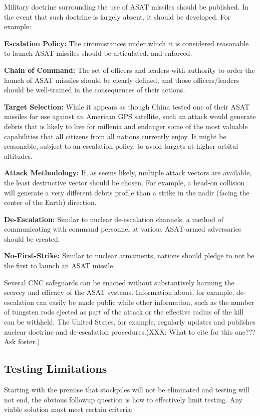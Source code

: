 Military doctrine surrounding the use of ASAT missiles should be
published.  In the event that such doctrine is largely absent, it
should be developed.  For example:

\textbf{Escalation Policy:} The circumstances under which it is
considered reasonable to launch ASAT missiles should be articulated,
and enforced.

\textbf{Chain of Command:} The set of officers and leaders with
authority to order the launch of ASAT missiles should be clearly
defined, and those officers/leaders should be well-trained in the
consequences of their actions.

\textbf{Target Selection:} While it appears as though China tested one
of their ASAT missiles for use against an American GPS satellite, such
an attack would generate debris that is likely to live for millenia
and endanger some of the most valuable capabilities that all citizens
from all nations currently enjoy.  It might be reasonable, subject to
an escalation policy, to avoid targets at higher orbital altitudes.

\textbf{Attack Methodology:} If, as seems likely, multiple attack
vectors are available, the least destructive vector should be chosen.
For example, a head-on collision will generate a very different debris
profile than a strike in the nadir (facing the center of the Earth)
direction.

\textbf{De-Escalation:} Similar to nuclear de-escalation channels, a
method of communicating with command personnel at various ASAT-armed
adversaries should be created.

\textbf{No-First-Strike:} Similar to nuclear armaments, nations should
pledge to not be the first to launch an ASAT missile.

Several CNC safeguards can be enacted without substantively harming
the secrecy and efficacy of the ASAT systems.  Information about, for
example, de-escalation can easily be made public while other
information, such as the number of tungsten rods ejected as part of
the attack or the effective radius of the kill can be withheld.  The
United States, for example, regularly updates and publishes nuclear
doctrine and de-escalation procedures.(XXX: What to cite for this
one??? Ask foster.)

\subsection{Testing Limitations}
Starting with the premise that stockpiles will not be eliminated and
testing will not end, the obvious followup question is how to
effectively limit testing.  Any viable solution must meet certain
criteria:

